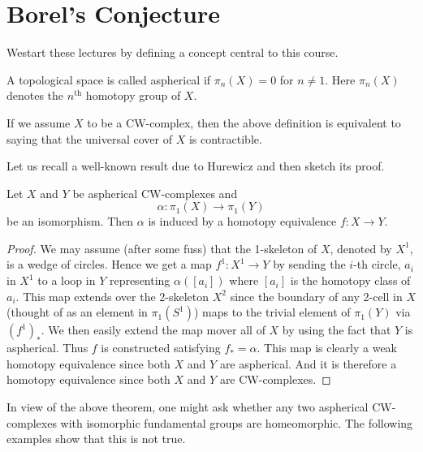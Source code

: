 \chapter{Borel's Conjecture}\label{c1}

We\pageoriginale start these lectures by defining a concept central to
this course.
\begin{defi}\label{c1:defi1.1}
  A topological space is called aspherical if $\pi_n(X)=0$ for $n \neq
  1$. Here $\pi_n(X)$ denotes the $n^{\text{th}}$ homotopy group of $X$.
\end{defi}

If we assume $X$ to be a CW-complex, then the above definition is
equivalent to saying that the universal cover of $X$ is contractible.

Let us recall a well-known result due to Hurewicz and then sketch its
proof. 

\begin{thm}\label{c1:thm1.2}
  Let $X$ and $Y$ be aspherical CW-complexes and 
$$
\alpha : \pi_1 (X)
  \to \pi_1 (Y)
$$ 
be an isomorphism. Then $\alpha$ is induced by a
  homotopy equivalence $f: X \to Y$.
\end{thm}

\begin{proof}
  We may assume (after some fuss) that the 1-skeleton of $X$, denoted
  by $X^1$, is a wedge of circles. Hence we get a map $f^1 : X^1 \to
  Y$ by sending the $i$-th circle, $a_i$ in $X^1$ to a loop in $Y$
  representing $\alpha ([a_i])$ where $[a_i]$ is the homotopy class of
  $a_i$. This map extends over the 2-skeleton $X^2$ since the boundary
  of any 2-cell in $X$ (thought of as an element in $\pi_1 (S^1)$)
  maps to the trivial element of $\pi_1 (Y)$ via $(f^1)_*$. We then
  easily extend the map mover all of $X$ by using the fact that $Y$ is
  aspherical. Thus $f$ is constructed satisfying $f_* =\alpha$. This
  map is clearly a weak homotopy equivalence since both $X$ and $Y$
  are aspherical. And it is therefore a homotopy equivalence since
  both $X$ and $Y$ are CW-complexes.
\end{proof}

In view of the above theorem, one might ask whether any two aspherical
CW-complexes with isomorphic fundamental groups are homeomorphic. The
following examples show that this is not true.

